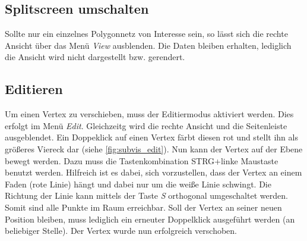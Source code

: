 \subsection{Splitscreen umschalten}

Sollte nur ein einzelnes Polygonnetz von Interesse sein, so lässt sich die rechte Ansicht über das Menü \emph{View} ausblenden.
Die Daten bleiben erhalten, lediglich die Ansicht wird nicht dargestellt bzw. gerendert.

\subsection{Editieren}

Um einen Vertex zu verschieben, muss der Editiermodus aktiviert werden. 
Dies erfolgt im Menü \emph{Edit}.
Gleichzeitg wird die rechte Ansicht und die Seitenleiste ausgeblendet.
Ein Doppeklick auf einen Vertex färbt diesen rot und stellt ihn als größeres Viereck dar (siehe \autoref{fig:subvis_edit}).
Nun kann der Vertex auf der Ebene bewegt werden. 
Dazu muss die Tastenkombination STRG+linke Maustaste benutzt werden.
Hilfreich ist es dabei, sich vorzustellen, dass der Vertex an einem Faden (rote Linie) hängt und dabei nur um die weiße Linie schwingt.
Die Richtung der Linie kann mittels der Taste \emph{S} orthogonal umgeschaltet werden. 
Somit sind alle Punkte im Raum erreichbar.
Soll der Vertex an seiner neuen Position bleiben, muss lediglich ein erneuter Doppelklick ausgeführt werden (an beliebiger Stelle).
Der Vertex wurde nun erfolgreich verschoben.






























